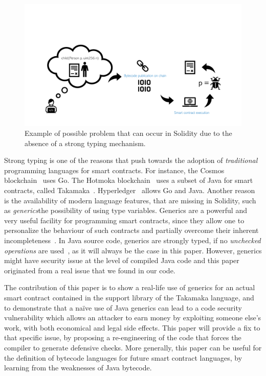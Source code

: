 \begin{figure}[ht]
\centering
\includegraphics[width=.9\linewidth]{figures/solidity_problem}
\caption{Example of possible problem that can occur in Solidity due to the absence of a strong typing mechanism.}
\label{figure.solidity_problem}
\end{figure}

Strong typing is one of the reasons that push towards the adoption
of \emph{traditional} programming languages for smart contracts. For instance,
the Cosmos blockchain~\cite{cosmos} uses Go. The
Hotmoka blockchain~\cite{hotmoka} uses a subset of Java
for smart contracts, called Takamaka~\cite{Spoto19,Spoto20}.
Hyperledger~\cite{hyperldeger} allows Go and Java.
Another reason is the availability of modern
language features, that are missing in Solidity,
such as \emph{generics}\ie the possibility of using
type variables. Generics are a powerful and very useful facility for programming
smart contracts, since they allow one to personalize the behaviour of such contracts and partially overcome their inherent incompleteness~\cite{ebp}. In Java source code, generics are strongly typed, if no \emph{unchecked operations}
are used~\cite{NaftalinW06}, as it will always be the case in this paper.
However, generics might have security issue at the level of compiled Java code and this paper originated from a
real issue that we found in our code.




The contribution of this paper is to show a real-life
use of generics for an actual smart contract contained in the support
library of the Takamaka language, and to demonstrate that a na\"{i}ve use
of Java generics can lead to a code security vulnerability which
allows an attacker to earn money by exploiting someone else's work, with both economical and legal side effects.
This paper will provide a fix to that specific issue,
by proposing a re-engineering of the code that forces the compiler to generate defensive checks.
More generally, this paper can be useful for the definition of
bytecode languages for future smart contract languages, by
learning from the weaknesses of Java bytecode.

